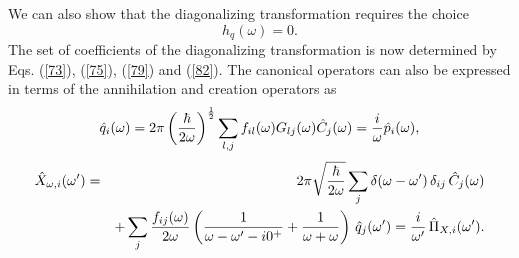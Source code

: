 \documentclass[preprint,showpacs,showkeys,groupedaddress,superscriptaddress]{revtex4}
\begin{document}
We can also show that the diagonalizing transformation requires the choice
\begin{equation}\label{82}
h_q(\omega)=0.
\end{equation}
The set of coefficients of the diagonalizing transformation is now determined by Eqs. (\ref{73}), (\ref{75}), (\ref{79}) and (\ref{82}). The canonical operators can also be expressed in terms of the annihilation and creation operators as
\begin{equation}
\hat q_i (\omega ) = 2\pi \left( {\frac{\hbar }{{2\omega }}} \right)^{\frac{{\rm 1}}{2}} \sum\limits_{l,j} {f_{il} (\omega )G_{lj} (\omega ) \hat C_j (\omega )}  = \frac{i}{\omega }\hat p_i (\omega ),
\end{equation}
\begin{eqnarray}\label{nnn}
\hat X_{\omega,i} (\omega') &=& 2\pi \sqrt{\frac{\hbar}{2\omega}} \sum\limits_j {\delta (\omega  - \omega ')\,\delta _{ij} \,\hat C_j (\omega )}\nonumber\\
 && + \sum\limits_j {\frac{{f_{ij} (\omega )}}{{2\omega }}\left(\frac{{\rm 1}}{{\omega  - \omega ' - i0^ +  }} + \frac{{\rm 1}}{{\omega  + \omega }}\right)\,\hat q_j (\omega ')}  = \frac{i}{{\omega '}}\,\hat \Pi _{X,i} (\omega ').\nonumber\\
\end{eqnarray}
\end{document}
